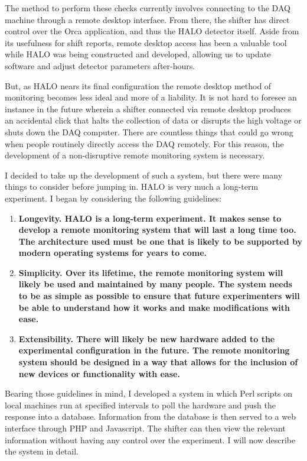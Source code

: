 		The method to perform these checks currently involves connecting to the DAQ machine through a remote desktop interface. From there, the shifter has direct control over the Orca application, and thus the HALO detector itself. Aside from its usefulness for shift reports, remote desktop access has been a valuable tool while HALO was being constructed and developed, allowing us to update software and adjust detector parameters after-hours. 

		But, as HALO nears its final configuration the remote desktop method of monitoring becomes less ideal and more of a liability. It is not hard to foresee an instance in the future wherein a shifter connected via remote desktop produces an accidental click that halts the collection of data or disrupts the high voltage or shuts down the DAQ computer. There are countless things that could go wrong when people routinely directly access the DAQ remotely. For this reason, the development of a non-disruptive remote monitoring system is necessary.

		I decided to take up the development of such a system, but there were many things to consider before jumping in. HALO is very much a long-term experiment. I began by considering the following guidelines:

		\begin{enumerate}
		\item \bf Longevity. \rm HALO is a long-term experiment. It makes sense to develop a remote monitoring system that will last a long time too. The architecture used must be one that is likely to be supported by modern operating systems for years to come.
		\item \bf Simplicity. \rm Over its lifetime, the remote monitoring system will likely be used and maintained by many people. The system needs to be as simple as possible to ensure that future experimenters will be able to understand how it works and make modifications with ease.
		\item \bf Extensibility. \rm There will likely be new hardware added to the experimental configuration in the future. The remote monitoring system should be designed in a way that allows for the inclusion of new devices or functionality with ease. 
		\end{enumerate}

		Bearing those guidelines in mind, I developed a system in which Perl scripts on local machines run at specified intervals to poll the hardware and push the response into a database. Information from the database is then served to a web interface through PHP and Javascript. The shifter can then view the relevant information without having any control over the experiment. I will now describe the system in detail.


